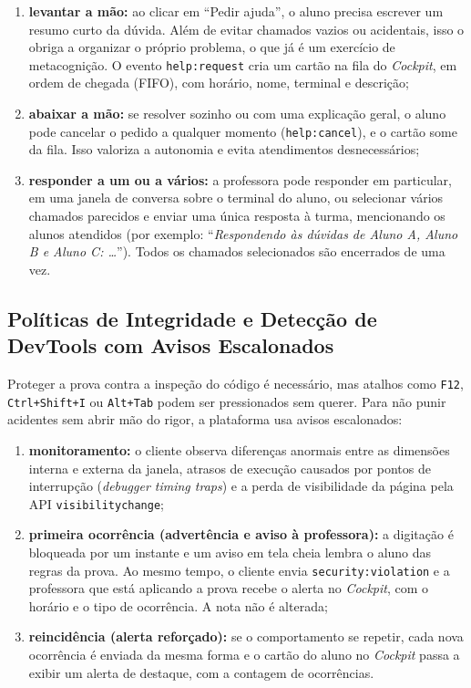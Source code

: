 \begin{enumerate}
    \item \textbf{levantar a mão:} ao clicar em ``Pedir ajuda'', o aluno precisa escrever um resumo curto da dúvida. Além de evitar chamados vazios ou acidentais, isso o obriga a organizar o próprio problema, o que já é um exercício de metacognição. O evento \texttt{help:request} cria um cartão na fila do \textit{Cockpit}, em ordem de chegada (FIFO), com horário, nome, terminal e descrição;
    \item \textbf{abaixar a mão:} se resolver sozinho ou com uma explicação geral, o aluno pode cancelar o pedido a qualquer momento (\texttt{help:cancel}), e o cartão some da fila. Isso valoriza a autonomia e evita atendimentos desnecessários;
    \item \textbf{responder a um ou a vários:} a professora pode responder em particular, em uma janela de conversa sobre o terminal do aluno, ou selecionar vários chamados parecidos e enviar uma única resposta à turma, mencionando os alunos atendidos (por exemplo: ``\textit{Respondendo às dúvidas de Aluno A, Aluno B e Aluno C: \ldots}''). Todos os chamados selecionados são encerrados de uma vez.
\end{enumerate}

\subsection{Políticas de Integridade e Detecção de DevTools com Avisos Escalonados}
\label{sec:integridade-devtools}

Proteger a prova contra a inspeção do código é necessário, mas atalhos como \texttt{F12}, \texttt{Ctrl+Shift+I} ou \texttt{Alt+Tab} podem ser pressionados sem querer. Para não punir acidentes sem abrir mão do rigor, a plataforma usa avisos escalonados:

\begin{enumerate}
    \item \textbf{monitoramento:} o cliente observa diferenças anormais entre as dimensões interna e externa da janela, atrasos de execução causados por pontos de interrupção (\textit{debugger timing traps}) e a perda de visibilidade da página pela API \texttt{visibilitychange};
    \item \textbf{primeira ocorrência (advertência e aviso à professora):} a digitação é bloqueada por um instante e um aviso em tela cheia lembra o aluno das regras da prova. Ao mesmo tempo, o cliente envia \texttt{security:violation} e a professora que está aplicando a prova recebe o alerta no \textit{Cockpit}, com o horário e o tipo de ocorrência. A nota não é alterada;
    \item \textbf{reincidência (alerta reforçado):} se o comportamento se repetir, cada nova ocorrência é enviada da mesma forma e o cartão do aluno no \textit{Cockpit} passa a exibir um alerta de destaque, com a contagem de ocorrências.
\end{enumerate}

